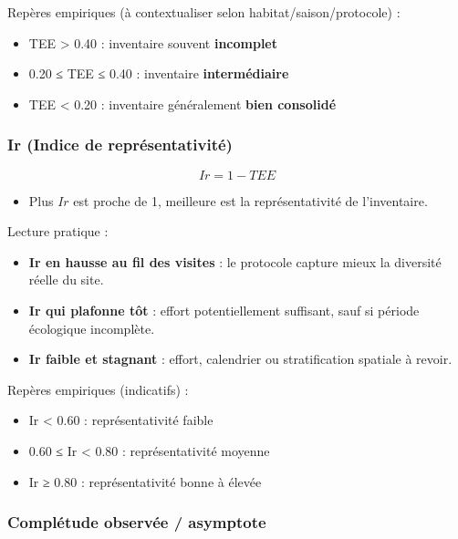 Repères empiriques (à contextualiser selon habitat/saison/protocole) :

\begin{itemize}
\tightlist
\item
  TEE \textgreater{} 0.40 : inventaire souvent \textbf{incomplet}
\item
  0.20 ≤ TEE ≤ 0.40 : inventaire \textbf{intermédiaire}
\item
  TEE \textless{} 0.20 : inventaire généralement \textbf{bien consolidé}
\end{itemize}

\subsubsection{Ir (Indice de
représentativité)}\label{ir-indice-de-repruxe9sentativituxe9}

\[Ir = 1 - TEE\]

\begin{itemize}
\tightlist
\item
  Plus \(Ir\) est proche de 1, meilleure est la représentativité de
  l'inventaire.
\end{itemize}

Lecture pratique :

\begin{itemize}
\tightlist
\item
  \textbf{Ir en hausse au fil des visites} : le protocole capture mieux
  la diversité réelle du site.
\item
  \textbf{Ir qui plafonne tôt} : effort potentiellement suffisant, sauf
  si période écologique incomplète.
\item
  \textbf{Ir faible et stagnant} : effort, calendrier ou stratification
  spatiale à revoir.
\end{itemize}

Repères empiriques (indicatifs) :

\begin{itemize}
\tightlist
\item
  Ir \textless{} 0.60 : représentativité faible
\item
  0.60 ≤ Ir \textless{} 0.80 : représentativité moyenne
\item
  Ir ≥ 0.80 : représentativité bonne à élevée
\end{itemize}

\subsubsection{Complétude observée /
asymptote}\label{compluxe9tude-observuxe9e-asymptote}

